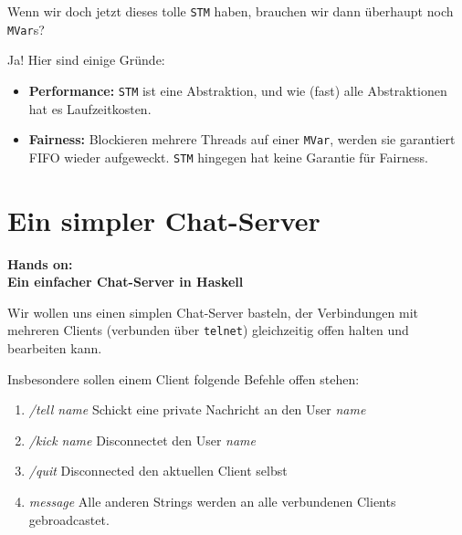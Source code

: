 \documentclass{beamer}
\begin{document}

\begin{frame}
Wenn wir doch jetzt dieses tolle \texttt{STM} haben, brauchen wir dann überhaupt noch \texttt{MVar}s?\pause\bigskip

Ja! Hier sind einige Gründe:\pause
\begin{itemize}
\item \textbf{Performance:} \texttt{STM} ist eine Abstraktion, und wie (fast) alle Abstraktionen hat es Laufzeitkosten.\pause
\item \textbf{Fairness:} Blockieren mehrere Threads auf einer \texttt{MVar}, werden sie garantiert FIFO wieder aufgeweckt. \texttt{STM} hingegen hat keine Garantie für Fairness.
\end{itemize} 
\end{frame}


\section{Ein simpler Chat-Server}

\begin{frame}

\begin{center}
\Large
\textbf{Hands on:\\Ein einfacher Chat-Server in Haskell}
\end{center}

\end{frame}


\begin{frame}

Wir wollen uns einen simplen Chat-Server basteln, der Verbindungen mit mehreren Clients 
(verbunden über \texttt{telnet}) gleichzeitig offen halten und bearbeiten kann.\pause\bigskip

Insbesondere sollen einem Client folgende Befehle offen stehen:
\begin{enumerate}
\item \emph{/tell name} Schickt eine private Nachricht an den User \emph{name}\pause
\item \emph{/kick name} Disconnectet den User \emph{name}\pause
\item \emph{/quit} Disconnected den aktuellen Client selbst\pause
\item \emph{message} Alle anderen Strings werden an alle verbundenen Clients gebroadcastet.
\end{enumerate}

\end{frame}
\end{document}

